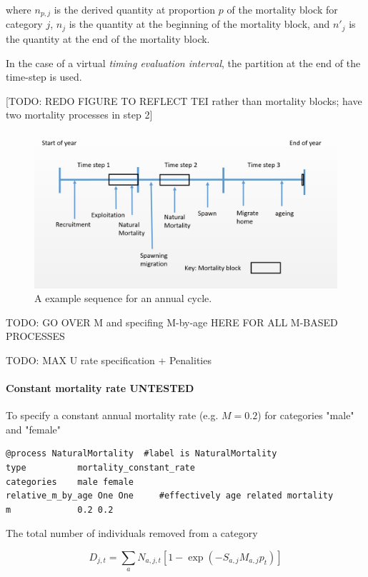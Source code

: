 where $n_{p,j}$ is the derived quantity at proportion $p$ of the mortality block for category $j$, $n_j$ is the quantity at the beginning of the mortality block, and $n'_j$ is the quantity at the end of the mortality block.

In the case of a virtual \textit{timing evaluation interval}, the partition at the end of the time-step is used. 

[TODO: REDO FIGURE TO REFLECT TEI rather than mortality blocks; have two mortality processes in step 2]

\begin{figure}[H]
	\centering
	\includegraphics[scale=0.5]{Figures/annual_cycle.jpg}
	\caption{A example sequence for an annual cycle.}\label{Fig:annual}
\end{figure}


TODO: GO OVER M and specifing M-by-age HERE FOR ALL M-BASED PROCESSES

TODO: MAX U rate specification + Penalities

\paragraph{Constant mortality rate UNTESTED}

To specify a constant annual mortality rate (e.g. $M=0.2$) for categories "male" and "female"

{\small{\begin{verbatim}
@process NaturalMortality  #label is NaturalMortality
type          mortality_constant_rate
categories    male female
relative_m_by_age One One     #effectively age related mortality 
m             0.2 0.2
\end{verbatim}}}

The total number of individuals removed from a category

\begin{equation}
D_{j,t} = \sum_a N_{a,j,t} [1 - \exp(-S_{a,j} M_{a,j} p_t)]
\end{equation}

